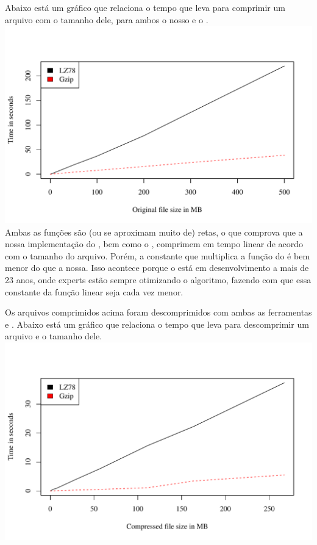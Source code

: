 Abaixo está um gráfico que relaciona o tempo que leva para comprimir um arquivo
com o tamanho dele, para ambos o nosso \lz e o \gzip.
\\
\includegraphics[scale=0.74]{../experiments/R/pdf/time_comp}
\\

Ambas as funções são (ou se aproximam muito de) retas, o que comprova que a
nossa implementação do \lz, bem como o \gzip, comprimem em tempo linear de
acordo com o tamanho do arquivo. Porém, a constante que multiplica a função do
\gzip é bem menor do que a nossa. Isso acontece porque o \gzip está em
desenvolvimento a mais de 23 anos, onde experts estão sempre otimizando o
algoritmo, fazendo com que essa constante da função linear seja cada vez menor.


Os arquivos comprimidos acima foram descomprimidos com ambas as ferramentas \lz
e \gzip. Abaixo está um gráfico que relaciona o tempo que leva para descomprimir
um arquivo e o tamanho dele.
\\
\includegraphics[scale=0.74]{../experiments/R/pdf/time_decomp}
\\

